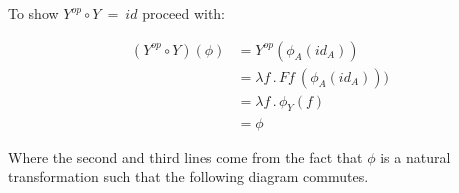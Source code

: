 \documentclass[a4paper,12pt]{article}
\begin{document}
To show $Y^{op} \circ Y \ = \ id$ proceed with:

\begin{align*}
    (Y^{op} \circ Y) (\phi) &= Y^{op} (\phi_{A}(id_{A})) \\
    &= \lambda f \, . \, F f \ (\phi_{A}( id_{A}))) \\
    &= \lambda f \, . \, \phi_{Y}(f) \\
    &= \phi
\end{align*}


Where the second and third lines come from the fact that $\phi$ is a natural
transformation such that the following diagram commutes.

\end{document}
